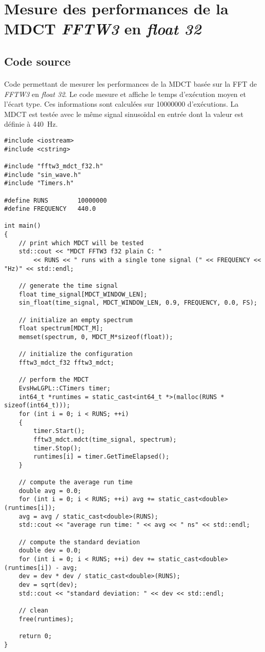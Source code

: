 \documentclass{article}
\begin{document}
\newpage
\section{Mesure des performances de la MDCT \emph{FFTW3} en \emph{float 32}}\label{app:perf_mdct_fftw3}
\subsection{Code source}\label{app:perf_mdct_fftw3_code}
\paragraph{}
Code permettant de mesurer les performances de la MDCT basée sur la FFT de \emph{FFTW3} en \emph{float 32}. Le code mesure et affiche le temps d'exécution moyen et l'écart type. Ces informations sont calculées sur \SI{10000000}{} d'exécutions. La MDCT est testée avec le même signal sinusoïdal en entrée dont la valeur est définie à \SI{440}{\hertz}.
\lstset{language=C++}
\begin{lstlisting}
#include <iostream>
#include <cstring>

#include "fftw3_mdct_f32.h"
#include "sin_wave.h"
#include "Timers.h"

#define RUNS        10000000
#define FREQUENCY   440.0

int main()
{
    // print which MDCT will be tested
    std::cout << "MDCT FFTW3 f32 plain C: "
        << RUNS << " runs with a single tone signal (" << FREQUENCY << "Hz)" << std::endl;

    // generate the time signal
    float time_signal[MDCT_WINDOW_LEN];
    sin_float(time_signal, MDCT_WINDOW_LEN, 0.9, FREQUENCY, 0.0, FS);

    // initialize an empty spectrum
    float spectrum[MDCT_M];
    memset(spectrum, 0, MDCT_M*sizeof(float));

    // initialize the configuration
    fftw3_mdct_f32 fftw3_mdct;

    // perform the MDCT
    EvsHwLGPL::CTimers timer;
    int64_t *runtimes = static_cast<int64_t *>(malloc(RUNS * sizeof(int64_t)));
    for (int i = 0; i < RUNS; ++i)
    {
        timer.Start();
        fftw3_mdct.mdct(time_signal, spectrum);
        timer.Stop();
        runtimes[i] = timer.GetTimeElapsed();
    }

    // compute the average run time
    double avg = 0.0;
    for (int i = 0; i < RUNS; ++i) avg += static_cast<double>(runtimes[i]);
    avg = avg / static_cast<double>(RUNS);
    std::cout << "average run time: " << avg << " ns" << std::endl;

    // compute the standard deviation
    double dev = 0.0;
    for (int i = 0; i < RUNS; ++i) dev += static_cast<double>(runtimes[i]) - avg;
    dev = dev * dev / static_cast<double>(RUNS);
    dev = sqrt(dev);
    std::cout << "standard deviation: " << dev << std::endl;

    // clean
    free(runtimes);

    return 0;
}
\end{lstlisting}
\end{document}
